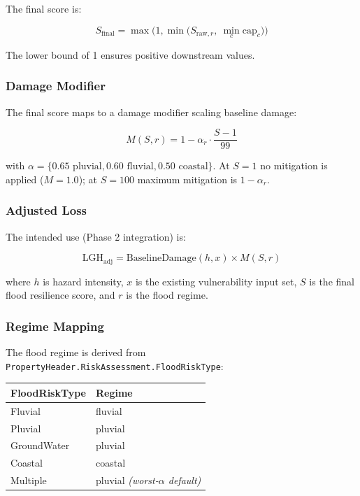 \documentclass[11pt,a4paper]{article}
\begin{document}
\noindent The final score is:

\begin{equation}
    S_{\text{final}} = \max\Big(1, \min\big(S_{\text{raw}, r},\ \min_c \text{cap}_c\big)\Big)
\end{equation}

\noindent The lower bound of 1 ensures positive downstream values.

\subsubsection{Damage Modifier}
The final score maps to a damage modifier scaling baseline damage:

\begin{equation}
    M(S, r) = 1 - \alpha_r \cdot \frac{S - 1}{99}
\end{equation}

\noindent with $\alpha = \{0.65 \text{ pluvial}, 0.60 \text{ fluvial}, 0.50 \text{ coastal}\}$.
At $S = 1$ no mitigation is applied ($M = 1.0$); at $S = 100$ maximum mitigation is
$1 - \alpha_r$.

\subsubsection{Adjusted Loss}
The intended use (Phase 2 integration) is:

\begin{equation}
    \text{LGH}_{\text{adj}} = \text{BaselineDamage}(h, x) \times M(S, r)
\end{equation}

\noindent where $h$ is hazard intensity, $x$ is the existing vulnerability input set,
$S$ is the final flood resilience score, and $r$ is the flood regime.

\subsubsection{Regime Mapping}
The flood regime is derived from \texttt{PropertyHeader.RiskAssessment.FloodRiskType}:

\begin{center}
\begin{tabular}{ll}
    \toprule
    \textbf{FloodRiskType} & \textbf{Regime} \\
    \midrule
    Fluvial       & fluvial \\
    Pluvial       & pluvial \\
    GroundWater   & pluvial \\
    Coastal       & coastal \\
    Multiple      & pluvial \emph{(worst-$\alpha$ default)} \\
    \bottomrule
\end{tabular}
\end{center}
\end{document}
